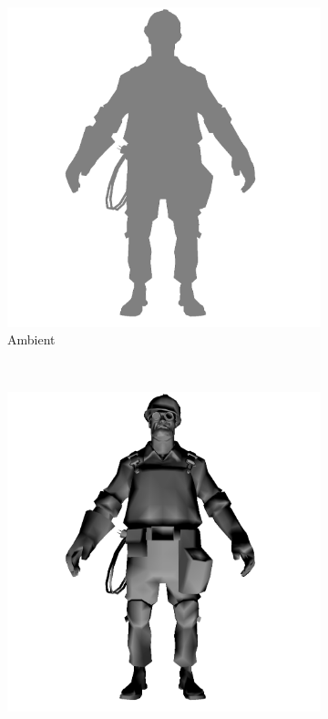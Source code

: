 
\begin{figure}[h]
    \centering
        \begin{subfigure}[b]{0.2\textwidth}
        \includegraphics[width=\textwidth]{img/Lighting/ambient.png}
        \caption{Ambient}
        \label{fig:ambient}
    \end{subfigure}
    ~
    \centering
    \begin{subfigure}[b]{0.2\textwidth}
        \includegraphics[width=\textwidth]{img/Lighting/diffuse.png}

\end{subfigure}
\end{figure}
